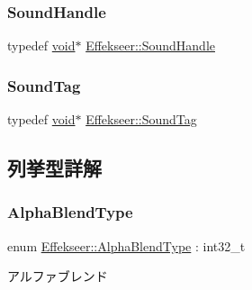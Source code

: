 \subsubsection{\texorpdfstring{Sound\+Handle}{SoundHandle}}
{\footnotesize\ttfamily typedef \mbox{\hyperlink{namespace_effekseer_ab34c4088e512200cf4c2716f168deb56}{void}}$\ast$ \mbox{\hyperlink{namespace_effekseer_a694a300b9b688ca40f6a0d9841d437bf}{Effekseer\+::\+Sound\+Handle}}}

\mbox{\label{namespace_effekseer_adb219197297396cf2ab9bee657551a29}} 
\subsubsection{\texorpdfstring{Sound\+Tag}{SoundTag}}
{\footnotesize\ttfamily typedef \mbox{\hyperlink{namespace_effekseer_ab34c4088e512200cf4c2716f168deb56}{void}}$\ast$ \mbox{\hyperlink{namespace_effekseer_adb219197297396cf2ab9bee657551a29}{Effekseer\+::\+Sound\+Tag}}}



\subsection{列挙型詳解}
\mbox{\label{namespace_effekseer_a8c32fd5b7ec7feed73314b2ae8086949}} 
\subsubsection{\texorpdfstring{Alpha\+Blend\+Type}{AlphaBlendType}}
{\footnotesize\ttfamily enum \mbox{\hyperlink{namespace_effekseer_a8c32fd5b7ec7feed73314b2ae8086949}{Effekseer\+::\+Alpha\+Blend\+Type}} \+: int32\+\_\+t\hspace{0.3cm}{\ttfamily [strong]}}



アルファブレンド 

